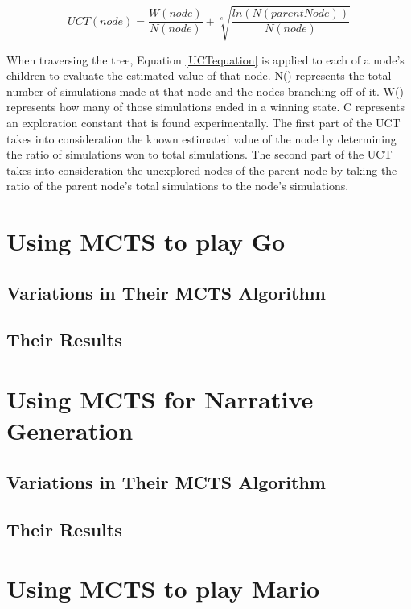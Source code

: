 \documentclass{sig-alternate}
\begin{document}
 \begin{equation}
 \label{UCTequation}
 UCT(node) = \frac{W(node)}{N(node)} + \sqrt[c]{\frac{ln(N(parentNode))}{N(node)}}
 \end{equation}

When traversing the tree, Equation \ref{UCTequation} is applied to each of a node's children to evaluate the estimated value of that node\cite{ActionSelection}. N() represents the total number of simulations made at that node and the nodes branching off of it. W() represents how many of those simulations ended in a winning state. C represents an exploration constant that is found experimentally. The first part of the UCT takes into consideration the known estimated value of the node by determining the ratio of simulations won to total simulations. The second part of the UCT takes into consideration the unexplored nodes of the parent node by taking the ratio of the parent node's total simulations to the node's simulations.

\section{Using MCTS to play Go}

\subsection{Variations in Their MCTS Algorithm}

\subsection{Their Results}

\section{Using MCTS for Narrative Generation}

\subsection{Variations in Their MCTS Algorithm}

\subsection{Their Results}

\section{Using MCTS to play Mario}
\end{document}

